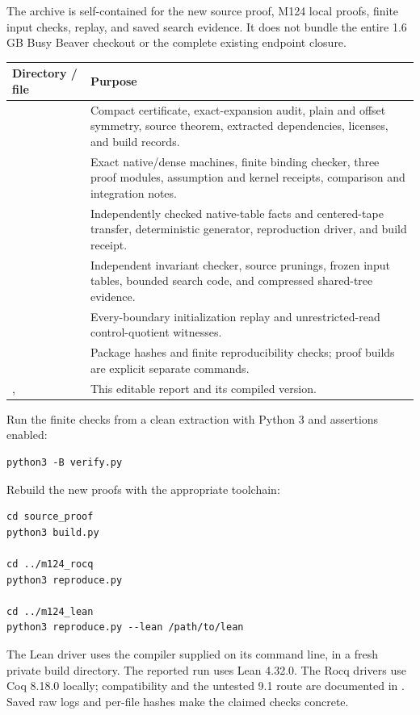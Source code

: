 \documentclass[11pt]{article}
\theoremstyle{remark}\newtheorem{remark}[theorem]{Remark}
\begin{document}
The archive is self-contained for the new source proof, M124 local proofs, finite input checks, replay, and saved search evidence. It does not bundle the entire 1.6 GB Busy Beaver checkout or the complete existing endpoint closure.

\begin{center}
\begin{tabularx}{\linewidth}{p{.29\linewidth}Y}
\toprule
Directory / file & Purpose \\
\midrule
{} & Compact certificate, exact-expansion audit, plain and offset symmetry, source theorem, extracted dependencies, licenses, and build records. \\
 & Exact native/dense machines, finite binding checker, three proof modules, assumption and kernel receipts, comparison and integration notes. \\
 & Independently checked native-table facts and centered-tape transfer, deterministic generator, reproduction driver, and build receipt. \\
 & Independent invariant checker, source prunings, frozen input tables, bounded search code, and compressed shared-tree evidence. \\
 & Every-boundary initialization replay and unrestricted-read control-quotient witnesses. \\
 & Package hashes and finite reproducibility checks; proof builds are explicit separate commands. \\
,  & This editable report and its compiled version. \\
\bottomrule
\end{tabularx}
\end{center}

Run the finite checks from a clean extraction with Python 3 and assertions enabled:
\begin{lstlisting}
python3 -B verify.py
\end{lstlisting}
Rebuild the new proofs with the appropriate toolchain:
\begin{lstlisting}
cd source_proof
python3 build.py

cd ../m124_rocq
python3 reproduce.py

cd ../m124_lean
python3 reproduce.py --lean /path/to/lean
\end{lstlisting}
The Lean driver uses the compiler supplied on its command line, in a fresh private build directory. The reported run uses Lean 4.32.0. The Rocq drivers use Coq 8.18.0 locally; compatibility and the untested 9.1 route are documented in . Saved raw logs and per-file hashes make the claimed checks concrete.
\end{document}
